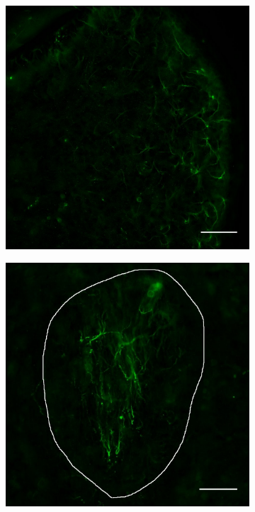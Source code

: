 \begin{figure}[h]
\begin{subfigure}[h]{0.245\textwidth}
		\end{subfigure}
		\begin{subfigure}[h]{0.245\textwidth}
			\caption{}
			\label{fig:locaMuSKhb}
			\includegraphics[width=\textwidth]{./Images/Immuno/Musk/MuSK_hb_50um.jpg}
		\end{subfigure}
		\begin{subfigure}[h]{0.245\textwidth}
			\caption{}
			\label{fig:locaMuSKfr}
			\includegraphics[width=\textwidth]{./Images/Immuno/Musk/MuSK_fr_50um.jpg}

\end{subfigure}
\end{figure}
